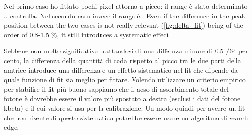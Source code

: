         
        Nel primo caso ho fittato pochi pixel attorno a picco: il range è stato determinato .. controlla. 
        Nel secondo caso invece il range è..      
        Even if the difference in the peak position between the two cases is not really relevant (\ref{fig:delta_fit}) being of the order of 0.8-1.5 \%,  it still introduces a systematic effect 

        Sebbene non molto significativa trattandosi di una differnza minore di 0.5 /64  per cento, la differenza della quantità di coda rispetto al picco tra le due parti della amtrice introduce una differenza e un effetto sistematico nel fit che dipende da quale funzione di fit sia meglio per fittare. 
        Volendo utilizzare un criterio empirico per stabilire il fit più buono sappiamo che il acso di assorbimento totale del fotone è dovrebbe essere il valore più spostato a destra (esclusi i dati del fotone kbeta) e il cui valore si usa per la calibrazione. 
        Un modo quindi per aveere un fit che non risente di questo sistematico potrebbe essere usare un algoritmo di search edge. 
        
